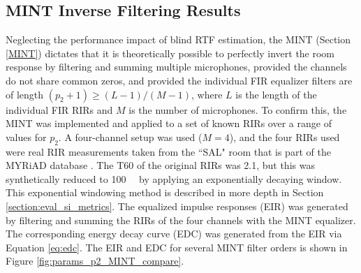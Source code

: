 \subsection{MINT Inverse Filtering Results} \label{section:params_p2_MINT} 

Neglecting the performance impact of blind RTF estimation, the MINT (Section \ref{MINT}) dictates that it is theoretically possible to perfectly invert the room response by filtering and summing multiple microphones, provided the channels do not share common zeros, and provided the individual FIR equalizer filters are of length $\left(p_2+1\right) \ge \left(L-1\right) / \left(M-1\right)$, where $L$ is the length of the individual FIR RIRs and $M$ is the number of microphones. To confirm this, the MINT was implemented and applied to a set of known RIRs over a range of values for $p_2$. A four-channel setup was used ($M=4$), and the four RIRs used were real RIR measurements taken from the ``SAL" room that is part of the MYRiAD database \citep[][discussed in more detail in Section \ref{section:rir_databases}]{dietzen2023myriad}. The T60 of the original RIRs was \qty{2.1}{\sec}, but this was synthetically reduced to \qty{100}{\milli\sec} by applying an exponentially decaying window. This exponential windowing method is described in more depth in Section \ref{section:eval_si_metrics}. The equalized impulse responses (EIR) was generated by filtering and summing the RIRs of the four channels with the MINT equalizer. The corresponding energy decay curve (EDC) was generated from the EIR via Equation \ref{eq:edc}. The EIR and EDC for several MINT filter orders is shown in Figure \ref{fig:params_p2_MINT_compare}.

